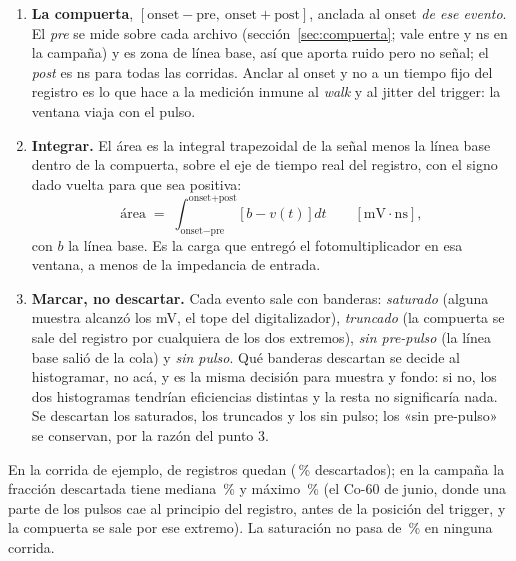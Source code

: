 \documentclass[11pt,a4paper]{article}
\begin{document}
\begin{enumerate}
      se recalculan respecto de la línea base definitiva. Una amplitud por
      debajo de cinco veces el ruido se marca como «sin pulso».
\item \textbf{La compuerta}, $[\text{onset} - \text{pre},\ \text{onset} +
      \text{post}]$, anclada al onset \emph{de ese evento}. El \emph{pre} se
      mide sobre cada archivo (sección~\ref{sec:compuerta}; vale entre
      \PreMin{} y \PreMax{} ns en la campaña) y es zona de línea base, así que
      aporta ruido pero no señal; el \emph{post} es \PostFijo{} ns para todas
      las corridas. Anclar al onset y no a un tiempo fijo del registro es lo
      que hace a la medición inmune al \emph{walk} y al jitter del trigger: la
      ventana viaja con el pulso.
\item \textbf{Integrar.} El área es la integral trapezoidal de la señal menos
      la línea base dentro de la compuerta, sobre el eje de tiempo real del
      registro, con el signo dado vuelta para que sea positiva:
      \[
         \text{área} \;=\; \int_{\text{onset}-\text{pre}}^{\text{onset}+\text{post}}
         \big[\,b - v(t)\,\big]\,dt \qquad [\text{mV}\cdot\text{ns}],
      \]
      con $b$ la línea base. Es la carga que entregó el fotomultiplicador en
      esa ventana, a menos de la impedancia de entrada.
\item \textbf{Marcar, no descartar.} Cada evento sale con banderas:
      \emph{saturado} (alguna muestra alcanzó los \VSatura{} mV, el tope del
      digitalizador), \emph{truncado} (la compuerta se sale del registro por
      cualquiera de los dos extremos), \emph{sin pre-pulso} (la línea base
      salió de la cola) y \emph{sin pulso}. Qué banderas descartan se decide
      al histogramar, no acá, y es la misma decisión para muestra y fondo: si
      no, los dos histogramas tendrían eficiencias distintas y la resta no
      significaría nada. Se descartan los saturados, los truncados y los sin
      pulso; los «sin pre-pulso» se conservan, por la razón del punto 3.
\end{enumerate}

En la corrida de ejemplo, de \EjEventos{} registros quedan \EjBuenos{}
(\EjDescartados\,\% descartados); en la campaña la fracción descartada tiene
mediana \DescartadosMediana\,\% y máximo \DescartadosMax\,\% (el Co-60 de
junio, donde una parte de los pulsos cae al principio del registro, antes de
la posición del trigger, y la compuerta se sale por ese extremo). La saturación no pasa de
\SaturadosMax\,\% en ninguna corrida.
\end{document}
